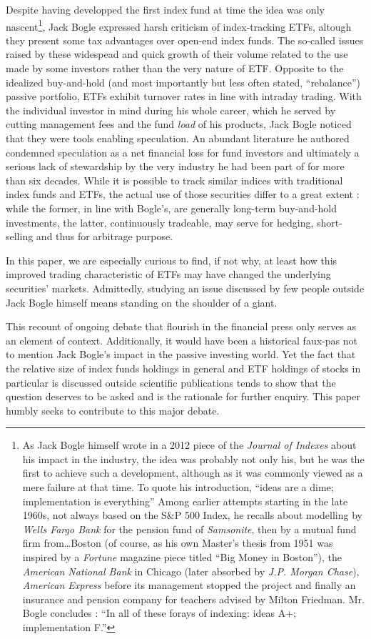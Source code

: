 Despite having developped the first index fund at time the idea was only nascent\footnote{As Jack Bogle himself wrote in a 2012 piece of the \textit{Journal of Indexes} about his impact in the industry, the idea was probably not only his, but he was the first to achieve such a development, although as it was commonly viewed as a mere failure at that time. To quote his introduction, ``ideas are a dime; implementation is everything'' Among earlier attempts starting in the late 1960s, not always based on the S\&P 500 Index, he recalls about modelling by \textit{Wells Fargo Bank} for the pension fund of \textit{Samsonite}, then by a mutual fund firm from\dots Boston (of course, as his own Master's thesis from 1951 was inspired by a \textit{Fortune} magazine piece titled ``Big Money in Boston''), the \textit{American National Bank} in Chicago (later absorbed by \textit{J.P. Morgan Chase}), \textit{American Express} before its management stopped the project and finally an insurance and pension company for teachers advised by Milton Friedman. Mr. Bogle concludes : ``In all of these forays of indexing: ideas A+; implementation F.''}, Jack Bogle expressed harsh criticism of index-tracking ETFs, altough they present some tax advantages over open-end index funds. The so-called issues raised by these widespead and quick growth of their volume related to the use made by some investors rather than the very nature of ETF. Opposite to the idealized buy-and-hold (and most importantly but less often stated, ``rebalance'') passive portfolio, ETFs exhibit turnover rates in line with intraday trading. With the individual investor in mind during his whole career, which he served by cutting management fees and the fund \textit{load} of his products, Jack Bogle noticed that they were tools enabling speculation. An abundant literature he authored condemned speculation as a net financial loss for fund investors and ultimately a serious lack of stewardship by the very industry he had been part of for more than six decades. While it is possible to track similar indices with traditional index funds and ETFs, the actual use of those securities differ to a great extent : while the former, in line with Bogle's, are generally long-term buy-and-hold investments, the latter, continuously tradeable, may serve for hedging, short-selling and thus for arbitrage purpose.

In this paper, we are especially curious to find, if not why, at least how this improved trading characteristic of ETFs may have changed the underlying securities' markets. Admittedly, studying an issue discussed by few people outside Jack Bogle himself means standing on the shoulder of a giant.

This recount of ongoing debate that flourish in the financial press only serves as an element of context. Additionally, it would have been a historical faux-pas not to mention Jack Bogle's impact in the passive investing world. Yet the fact that the relative size of index funds holdings in general and ETF holdings of stocks in particular is discussed outside scientific publications tends to show that the question deserves to be asked and is the rationale for further enquiry. This paper humbly seeks to contribute to this major debate. 
